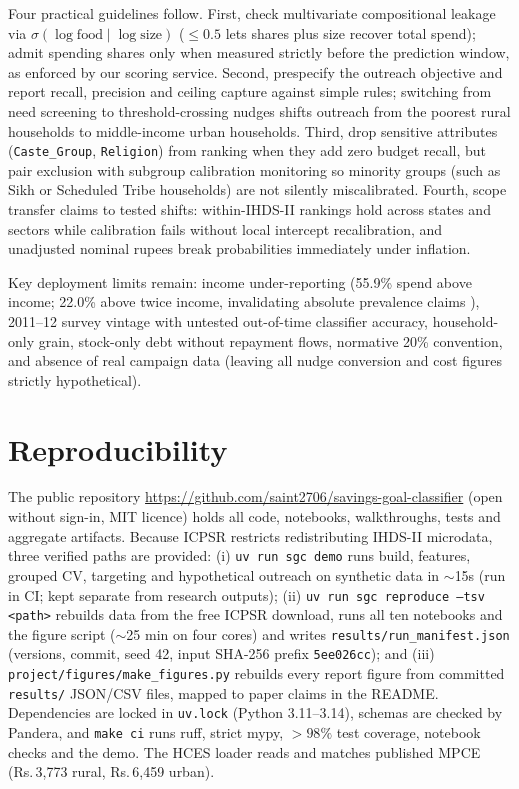 \documentclass[conference]{IEEEtran}
\newcommand{\rs}{Rs.\,}
\begin{document}
Four practical guidelines follow. First, check multivariate compositional leakage via $\sigma(\log\text{food}\mid\log\text{size})$ ($\leq 0.5$ lets shares plus size recover total spend); admit spending shares only when measured strictly before the prediction window, as enforced by our scoring service. Second, prespecify the outreach objective and report recall, precision and ceiling capture against simple rules; switching from need screening to threshold-crossing nudges shifts outreach from the poorest rural households to middle-income urban households. Third, drop sensitive attributes (\texttt{Caste\_Group}, \texttt{Religion}) from ranking when they add zero budget recall, but pair exclusion with subgroup calibration monitoring so minority groups (such as Sikh or Scheduled Tribe households) are not silently miscalibrated. Fourth, scope transfer claims to tested shifts: within-IHDS-II rankings hold across states and sectors while calibration fails without local intercept recalibration, and unadjusted nominal rupees break probabilities immediately under inflation.

Key deployment limits remain: income under-reporting (55.9\% spend above income; 22.0\% above twice income, invalidating absolute prevalence claims \cite{deaton2005}), 2011--12 survey vintage with untested out-of-time classifier accuracy, household-only grain, stock-only debt without repayment flows, normative 20\% convention, and absence of real campaign data (leaving all nudge conversion and cost figures strictly hypothetical).

\section{Reproducibility}
\label{sec:reproducibility}

The public repository \url{https://github.com/saint2706/savings-goal-classifier} (open without sign-in, MIT licence) holds all code, notebooks, walkthroughs, tests and aggregate artifacts. Because ICPSR restricts redistributing IHDS-II microdata, three verified paths are provided: (i) \texttt{uv run sgc demo} runs build, features, grouped CV, targeting and hypothetical outreach on synthetic data in $\sim$15s (run in CI; kept separate from research outputs); (ii) \texttt{uv run sgc reproduce --tsv <path>} rebuilds data from the free ICPSR download, runs all ten notebooks and the figure script ($\sim$25 min on four cores) and writes \texttt{results/run\_manifest.json} (versions, commit, seed 42, input SHA-256 prefix \texttt{5ee026cc}); and (iii) \texttt{project/figures/make\_figures.py} rebuilds every report figure from committed \texttt{results/} JSON/CSV files, mapped to paper claims in the README. Dependencies are locked in \texttt{uv.lock} (Python 3.11--3.14), schemas are checked by Pandera, and \texttt{make ci} runs ruff, strict mypy, $>98\%$ test coverage, notebook checks and the demo. The HCES loader reads \cite{hces} and matches published MPCE (\rs 3,773 rural, \rs 6,459 urban).
\end{document}
